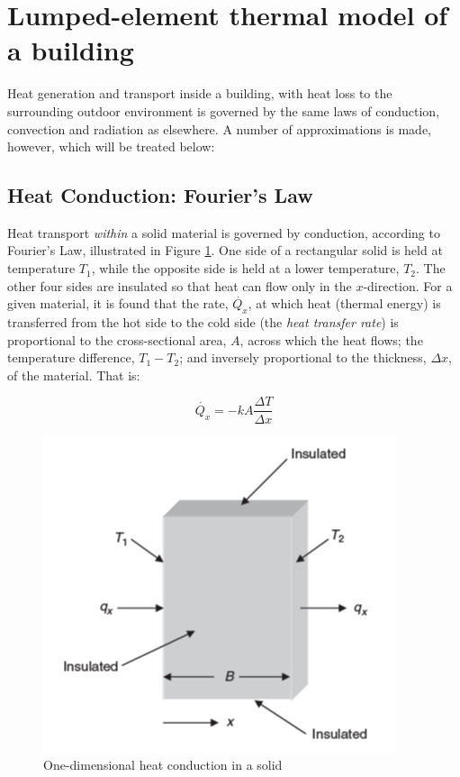 \section{Lumped-element thermal model of a building}

Heat generation and transport inside a building, with heat loss to the surrounding outdoor environment is governed by the same laws of conduction, convection and radiation as elsewhere. A number of approximations is made, however, which will be treated below:

\subsection{Heat Conduction: Fourier's Law}

Heat transport \emph{within} a solid material is governed by conduction, according to Fourier's Law, illustrated in Figure \ref{fig:heatcond_1d}.
One side of a rectangular solid is held at temperature $T_1$, while the opposite side is held at a lower temperature, $T_2$. The other four sides are insulated so that heat can flow only in the $x$-direction. For a given material, it is found that the rate, $\dot{Q_x}$, at which heat (thermal energy) is transferred from the hot side to the cold side (the \emph{heat transfer rate}) is proportional to the cross-sectional area, $A$, across which the heat flows; the temperature difference, $T_1 - T_2$; and inversely proportional to
the thickness, $\Delta x$, of the material. That is:

\begin{equation}
	\label{eq:fourierlaw}
	\dot{Q_x} = - kA \frac{\Delta T}{\Delta x}
\end{equation}

\begin{figure}[H]
	\centering
	\includegraphics[width=0.5\columnwidth]{Figures/heat_conduction_1d.png}
	\caption[Short title]{One-dimensional heat conduction in a solid}
	\label{fig:heatcond_1d}
\end{figure} 

